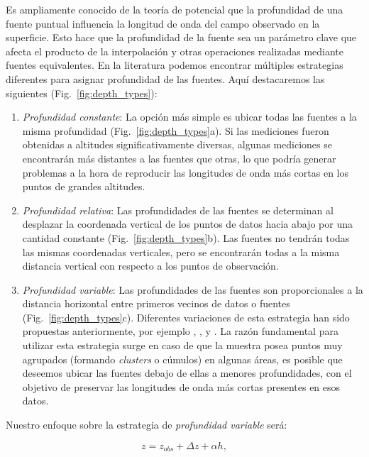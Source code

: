 Es ampliamente conocido de la teoría de potencial que la profundidad de una
fuente puntual influencia la longitud de onda del campo observado en la
superficie.
Esto hace que la profundidad de la fuente sea un parámetro clave que afecta el
producto de la interpolación y otras operaciones realizadas mediante fuentes
equivalentes.
En la literatura podemos encontrar múltiples estrategias diferentes para
asignar profundidad de las fuentes.
Aquí destacaremos las siguientes (Fig.~\ref{fig:depth_types}):

\begin{enumerate}
  \item
    \emph{Profundidad constante}:
    La opción más simple es ubicar todas las fuentes a la misma profundidad
    (Fig.~\ref{fig:depth_types}a).
    Si las mediciones fueron obtenidas a altitudes significativamente diversas,
    algunas mediciones se encontrarán más distantes a las fuentes que otras,
    lo que podría generar problemas a la hora de reproducir las longitudes de
    onda más cortas en los puntos de grandes altitudes.
 \item
    \emph{Profundidad relativa}:
    Las profundidades de las fuentes se determinan al desplazar la coordenada
    vertical de los puntos de datos hacia abajo por una cantidad constante
    (Fig.~\ref{fig:depth_types}b).
    Las fuentes no tendrán todas las mismas coordenadas verticales, pero se
    encontrarán todas a la misma distancia vertical con respecto a los puntos
    de observación.
 \item
    \emph{Profundidad variable}:
    Las profundidades de las fuentes son proporcionales a la distancia
    horizontal entre primeros vecinos de datos o fuentes (Fig.~\ref{fig:depth_types}c).
    Diferentes variaciones de esta estrategia han sido propuestas
    anteriormente, por ejemplo
    \citet{cordell1992}, \citet{guspi2004}, y \citet{guspi2009}.
    La razón fundamental para utilizar esta estrategia surge en caso de que la
    muestra posea puntos muy agrupados (formando \emph{clusters} o cúmulos) en
    algunas áreas, es posible que deseemos ubicar las fuentes debajo de ellas
    a menores profundidades, con el objetivo de preservar las longitudes de
    onda más cortas presentes en esos datos.
\end{enumerate}

Nuestro enfoque sobre la estrategia de \emph{profundidad variable} será:

\begin{equation}
  z = z_{obs} + \Delta z + \alpha h,
  \label{eq:variable_depth}
\end{equation}

